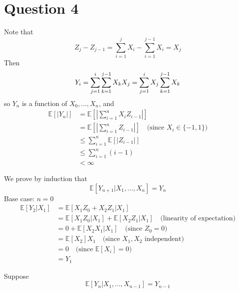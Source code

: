 \documentclass[11pt]{article} %
\begin{document}
\section*{Question 4}
Note that
\[Z_j - Z_{j-1} = \sum_{i=1}^j X_i - \sum_{i=1}^{j-1} X_i = X_j\]
Then
\[Y_i = \sum_{j=1}^i \sum_{k=1}^{j-1} X_k X_j\\
= \sum_{j=1}^i X_j \sum_{k=1}^{j-1} X_k\]
so $Y_n$ is a function of $X_0,...,X_n$, and
\begin{equation}
\begin{aligned}
\mathbb{E}[|Y_n|]&=\mathbb{E}\left[\left|\sum_{i=1}^n X_i Z_{i-1}\right|\right]\\
&=\mathbb{E}\left[\left|\sum_{i=1}^n Z_{i-1}\right|\right] 
\quad\text {(since $X_i\in\{-1,1\}$)}\\
&\leq \sum_{i=1}^n \mathbb{E}[|Z_{i-1}|]\\
&\leq \sum_{i=1}^n (i-1)\\
&<\infty
\end{aligned}
\end{equation}

We prove by induction that 
\[ \mathbb{E}[Y_{n+1}|X_1,...,X_n]=Y_n\]
Base case: $n=0$
\begin{equation}
\begin{aligned}
\mathbb{E}[Y_2|X_1]&=\mathbb{E}[X_1 Z_0 + X_2 Z_1 | X_1]\\
&= \mathbb{E}[X_1 Z_0 | X_1] + \mathbb{E}[X_2 Z_1 | X_1] \quad\text{(linearity of expectation)}\\
&= 0 + \mathbb{E}[X_2 X_1 | X_1] \quad\text{(since $Z_0=0$)}\\
&= \mathbb{E}[X_2]X_1 \quad\text{(since $X_1,X_2$ independent)}\\
&= 0 \quad\text{(since $\mathbb{E}[X_i]=0$)}\\
&= Y_1
\end{aligned}
\end{equation}

Suppose
\[\mathbb{E}[Y_n|X_1,...,X_{n-1}]=Y_{n-1}\]
\end{document}
